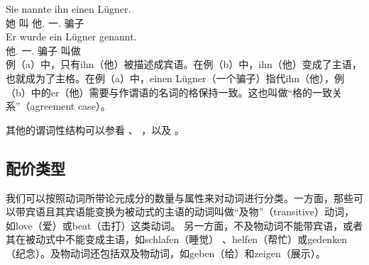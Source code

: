 \eal
\ex 
\gll Sie nannte ihn einen Lügner.\\
	 她 叫 他.\acc{} 一.\acc{} 骗子\\
\ex 
\gll Er wurde ein Lügner genannt.\\
	 他.\nom{} \passivepst{} 一.\nom{} 骗子 叫做\\
\zl
例（a）中，只有ihn（他）被描述成宾语。在例（b）中，ihn（他）变成了主语，也就成为了主格。在例（a）中，einen Lügner（一个骗子）指代ihn（他），例（b）中的er（他）需要与作谓语的名词的格保持一致。这也叫做“格的一致关系”（agreement case）。

其他的谓词性结构可以参看 、 ，以及 。

\subsection{配价类型}

我们可以按照动词所带论元成分的数量与属性来对动词进行分类。一方面，那些可以带宾语且其宾语能变换为被动式的主语的动词叫做“及物”（transitive）动词，如love（爱）或beat（击打）这类动词。
另一方面，不及物动词不能带宾语，或者其在被动式中不能变成主语，如schlafen（睡觉） 、helfen（帮忙）或gedenken（纪念）。及物动词还包括双及物动词，如geben（给）和zeigen（展示）。


